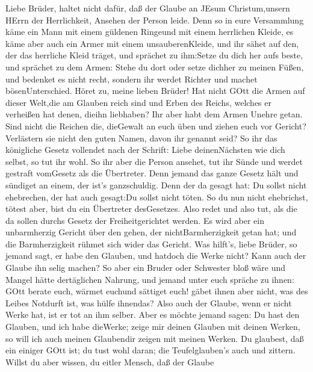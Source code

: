  Liebe Brüder, haltet nicht dafür, daß der Glaube an JEsum
Christum,unsern HErrn der Herrlichkeit, Ansehen der Person leide.
 Denn so in eure Versammlung käme ein Mann mit einem
güldenen Ringeund mit einem herrlichen Kleide, es käme aber auch ein
Armer mit einem unsauberenKleide,  und ihr sähet auf den,
der das herrliche Kleid träget, und sprächet zu ihm:Setze du dich her
aufs beste, und sprächet zu dem Armen: Stehe du dort oder setze dichher
zu meinen Füßen,  und bedenket es nicht recht, sondern ihr
werdet Richter und machet bösenUnterschied.  Höret zu, meine
lieben Brüder! Hat nicht GOtt die Armen auf dieser Welt,die am Glauben
reich sind und Erben des Reichs, welches er verheißen hat denen, dieihn
liebhaben?  Ihr aber habt dem Armen Unehre getan. Sind nicht
die Reichen die, dieGewalt an euch üben und ziehen euch vor Gericht?
 Verlästern sie nicht den guten Namen, davon ihr genannt
seid?  So ihr das königliche Gesetz vollendet nach der
Schrift: Liebe deinenNächsten wie dich selbst, so tut ihr wohl.
 So ihr aber die Person ansehet, tut ihr Sünde und werdet
gestraft vomGesetz als die Übertreter.  Denn jemand das
ganze Gesetz hält und sündiget an einem, der ist's ganzschuldig.
 Denn der da gesagt hat: Du sollst nicht ehebrechen, der
hat auch gesagt:Du sollst nicht töten. So du nun nicht ehebrichst,
tötest aber, bist du ein Übertreter desGesetzes.  Also
redet und also tut, als die da sollen durchs Gesetz der
Freiheitgerichtet werden.  Es wird aber ein unbarmherzig
Gericht über den gehen, der nichtBarmherzigkeit getan hat; und die
Barmherzigkeit rühmet sich wider das Gericht.  Was hilft's,
liebe Brüder, so jemand sagt, er habe den Glauben, und hatdoch die Werke
nicht? Kann auch der Glaube ihn selig machen?  So aber ein
Bruder oder Schwester bloß wäre und Mangel hätte dertäglichen Nahrung,
 und jemand unter euch spräche zu ihnen: GOtt berate euch,
wärmet euchund sättiget euch! gäbet ihnen aber nicht, was des Leibes
Notdurft ist, was hülfe ihnendas?  Also auch der Glaube,
wenn er nicht Werke hat, ist er tot an ihm selber.  Aber es
möchte jemand sagen: Du hast den Glauben, und ich habe dieWerke; zeige
mir deinen Glauben mit deinen Werken, so will ich auch meinen Glaubendir
zeigen mit meinen Werken.  Du glaubest, daß ein einiger
GOtt ist; du tust wohl daran; die Teufelglauben's auch und zittern.
 Willst du aber wissen, du eitler Mensch, daß der Glaube
